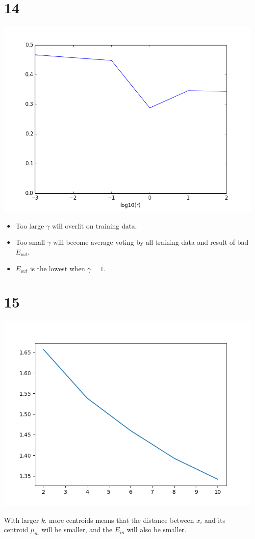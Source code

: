 \documentclass[12pt]{article}
\begin{document}
\section*{14}
\begin{center}
    \includegraphics[scale=0.5]{p14.png}
\end{center}
\begin{itemize}
    \item Too large $\gamma$ will overfit on training data.
    \item Too small $\gamma$ will become average voting by all training data and result of bad $E_{out}$.
    \item $E_{out}$ is the lowest when $\gamma=1$.
\end{itemize}

\section*{15}
\begin{center}
    \includegraphics[scale=0.5]{p15.png}
\end{center}
With larger $k$, more centroids means that 
the distance between $x_i$ and its centroid $\mu_m$ will be smaller, 
and the $E_{in}$ will also be smaller.
\end{document}
